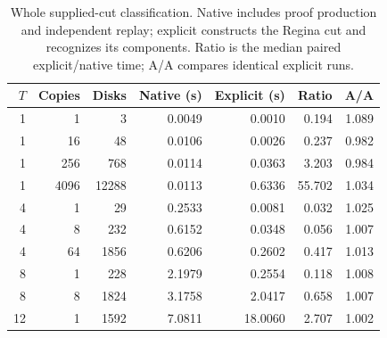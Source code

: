 \begin{table}[htbp]
\centering\small
\begin{tabular}{rrrrrrr}
\toprule
$T$ & Copies & Disks & Native (s) & Explicit (s) & Ratio & A/A \\
\midrule
1 & 1 & 3 & 0.0049 & 0.0010 & 0.194 & 1.089 \\
1 & 16 & 48 & 0.0106 & 0.0026 & 0.237 & 0.982 \\
1 & 256 & 768 & 0.0114 & 0.0363 & 3.203 & 0.984 \\
1 & 4096 & 12288 & 0.0113 & 0.6336 & 55.702 & 1.034 \\
4 & 1 & 29 & 0.2533 & 0.0081 & 0.032 & 1.025 \\
4 & 8 & 232 & 0.6152 & 0.0348 & 0.056 & 1.007 \\
4 & 64 & 1856 & 0.6206 & 0.2602 & 0.417 & 1.013 \\
8 & 1 & 228 & 2.1979 & 0.2554 & 0.118 & 1.008 \\
8 & 8 & 1824 & 3.1758 & 2.0417 & 0.658 & 1.007 \\
12 & 1 & 1592 & 7.0811 & 18.0060 & 2.707 & 1.002 \\
\bottomrule
\end{tabular}
\caption{Whole supplied-cut classification. Native includes proof production and independent replay; explicit constructs the Regina cut and recognizes its components. Ratio is the median paired explicit/native time; A/A compares identical explicit runs.}
\label{marked-cut:timings}
\end{table}
